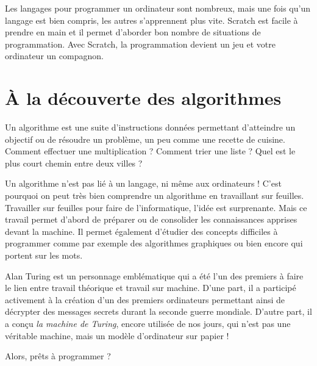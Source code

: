 \bigskip

Les langages pour programmer un ordinateur sont nombreux, mais une fois qu'un langage est bien compris, les autres s'apprennent plus vite.
Scratch est facile à prendre en main et il permet d'aborder bon nombre de situations de programmation.
Avec Scratch, la programmation devient un jeu et votre ordinateur un compagnon.


\section*{À la découverte des algorithmes}

Un algorithme est une suite d'instructions données permettant d'atteindre un objectif ou de résoudre un problème, un peu comme une recette de cuisine. Comment effectuer une multiplication ? Comment trier une liste ? Quel est le plus court chemin entre deux villes ?

\bigskip

Un algorithme n'est pas lié à un langage, ni même aux ordinateurs ! C'est pourquoi on peut très bien comprendre un algorithme en travaillant sur feuilles. Travailler sur feuilles pour faire de l'informatique, l'idée est surprenante. Mais ce travail permet d'abord de préparer ou de consolider les connaissances apprises devant la machine. Il permet également d'étudier des concepts difficiles à programmer comme par exemple des algorithmes graphiques ou bien encore qui portent sur les mots. 

\bigskip

Alan Turing est un personnage emblématique qui a été l'un des premiers à faire le lien entre travail théorique et travail sur machine. D'une part, il a participé activement à la création d'un des premiers ordinateurs permettant ainsi de décrypter des messages secrets durant la seconde guerre mondiale. D'autre part, il a conçu \emph{la machine de Turing}, encore utilisée de nos jours, qui n'est pas une véritable machine, mais un modèle d'ordinateur sur papier ! 

\bigskip

\hfill Alors, prêts à programmer ?

\vspace*{\fill}

\cleardoublepage
\thispagestyle{empty}
\tableofcontents
